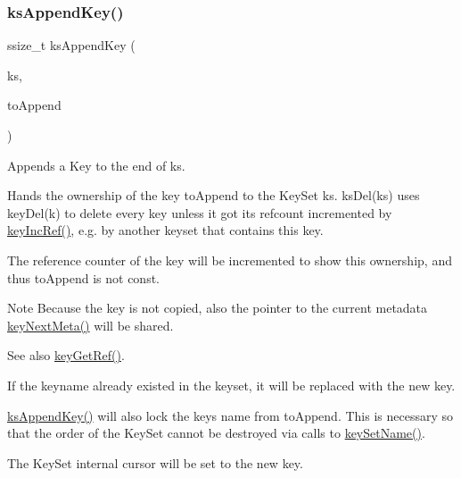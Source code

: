\subsubsection{\texorpdfstring{ksAppendKey()}{ksAppendKey()}}
{\footnotesize\ttfamily ssize\+\_\+t ks\+Append\+Key (\begin{DoxyParamCaption}\item[{Key\+Set $\ast$}]{ks,  }\item[{Key $\ast$}]{to\+Append }\end{DoxyParamCaption})}



Appends a Key to the end of {\ttfamily ks}. 

Hands the ownership of the key {\ttfamily to\+Append} to the Key\+Set {\ttfamily ks}. ks\+Del(ks) uses key\+Del(k) to delete every key unless it got its refcount incremented by \mbox{\hyperlink{group__key_ga6970a6f254d67af7e39f8e469bb162f1}{key\+Inc\+Ref()}}, e.\+g. by another keyset that contains this key.

The reference counter of the key will be incremented to show this ownership, and thus {\ttfamily to\+Append} is not const.

\begin{DoxyNote}{Note}
Because the key is not copied, also the pointer to the current metadata \mbox{\hyperlink{group__keymeta_ga4c88342f580a4291455a801af71ce048}{key\+Next\+Meta()}} will be shared.
\end{DoxyNote}
\begin{DoxySeeAlso}{See also}
\mbox{\hyperlink{group__key_ga4aabc4272506dd63161db2bbb42de8ae}{key\+Get\+Ref()}}.
\end{DoxySeeAlso}
If the keyname already existed in the keyset, it will be replaced with the new key.

\mbox{\hyperlink{group__keyset_gaa5a1d467a4d71041edce68ea7748ce45}{ks\+Append\+Key()}} will also lock the key\textquotesingle{}s name from {\ttfamily to\+Append}. This is necessary so that the order of the Key\+Set cannot be destroyed via calls to \mbox{\hyperlink{group__keyname_ga7699091610e7f3f43d2949514a4b35d9}{key\+Set\+Name()}}.

The Key\+Set internal cursor will be set to the new key.

